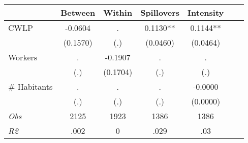 \begin{tabular}{l*{6}{c}}\hline&\multicolumn{1}{c}{Between}&\multicolumn{1}{c}{Within}&\multicolumn{1}{c}{Spillovers}&\multicolumn{1}{c}{Intensity}\\ \hline 
CWLP & -0.0604 & . & 0.1130** & 0.1144** \\
 & (0.1570) & (.) & (0.0460) & (0.0464) \\
Workers & . & -0.1907 & . & . \\
 & (.) & (0.1704) & (.) & (.) \\
\# Habitants & . & . & . & -0.0000 \\
  & (.) & (.) & (.) & (0.0000) \\
\hline \textit{Obs} & 2125 & 1923 & 1386 & 1386  \\ \textit{R2} & .002 & 0 & .029 & .03 \\ \hline \end{tabular}
